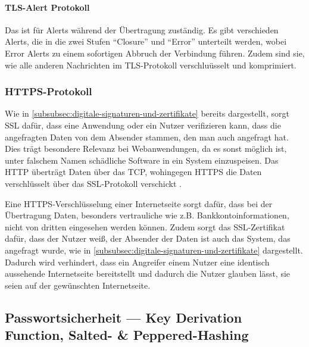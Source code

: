 \paragraph[TLS-Alert Protokoll]{\ac{TLS}-Alert Protokoll}\label{par:tls_alert_protocol}

Das  ist für Alerts während der Übertragung zuständig. Es gibt verschieden Alerts, die in die zwei Stufen \enquote{Closure} und \enquote{Error} unterteilt werden, wobei Error Alerts zu einem sofortigen Abbruch der Verbindung führen.\autocite[\vglf][]{Transpor18:online} Zudem sind sie, wie alle anderen Nachrichten im \ac{TLS}-Protokoll verschluüsselt und komprimiert.\autocite[\vglf][]{RFC8446}

\subsubsection[HTTPS-Protocol]{\ac{HTTPS}-Protokoll}\label{subsubsec:HTTPS-Protocol}

Wie in \autoref{subsubsec:digitale-signaturen-und-zertifikate} bereits dargestellt, sorgt \ac{SSL} dafür, dass eine Anwendung oder ein Nutzer verifizieren kann, dass die angefragten Daten von dem Absender stammen, den man auch angefragt hat. Dies trägt besondere Relevanz bei Webanwendungen, da es sonst möglich ist, unter falschem Namen schädliche Software in ein System einzuspeisen.
Das \ac{HTTP} überträgt Daten über das \ac{TCP}, wohingegen \ac{HTTPS} die Daten verschlüsselt über das \ac{SSL}-Protokoll verschickt \autocites{2674005.2674991:online}{RFC5246T44:online}.

Eine \ac{HTTPS}-Verschlüsselung einer Internetseite sorgt dafür, dass bei der Übertragung Daten, besonders vertrauliche wie z.B. Bankkontoinformationen, nicht von dritten eingesehen werden können\autocite[\vglf][]{CloudfareWarumHTTPS:online}. Zudem sorgt das \ac{SSL}-Zertifikat dafür, dass der Nutzer weiß, der Absender der Daten ist auch das System, das angefragt wurde, wie in \autoref{subsubsec:digitale-signaturen-und-zertifikate} dargestellt. Dadurch wird verhindert, dass ein Angreifer einem Nutzer eine identisch aussehende Internetseite bereitstellt und dadurch die Nutzer glauben lässt, sie seien auf der gewünschten Internetseite\autocite[\vglf][]{CloudfareWarumHTTPS:online}.

\subsection[Passwortsicherheit]{Passwortsicherheit — Key Derivation Function, Salted- \& Peppered-Hashing}\label{subsec:passwortsicherheit}

